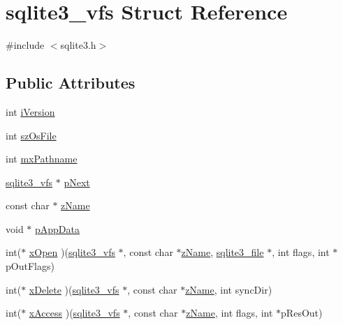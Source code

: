 \hypertarget{structsqlite3__vfs}{}\section{sqlite3\+\_\+vfs Struct Reference}
\label{structsqlite3__vfs}


{\ttfamily \#include $<$sqlite3.\+h$>$}

\subsection*{Public Attributes}
\begin{DoxyCompactItemize}
\item 
int \mbox{\hyperlink{structsqlite3__vfs_a694dd264949bd163545fe174510ed019}{i\+Version}}
\item 
int \mbox{\hyperlink{structsqlite3__vfs_a549399081342d61134b6398562a0a997}{sz\+Os\+File}}
\item 
int \mbox{\hyperlink{structsqlite3__vfs_adb2d82c74891b00b5529fb94e7710135}{mx\+Pathname}}
\item 
\mbox{\hyperlink{structsqlite3__vfs}{sqlite3\+\_\+vfs}} $\ast$ \mbox{\hyperlink{structsqlite3__vfs_ae795a4417697ecd35163f6cdf0069073}{p\+Next}}
\item 
const char $\ast$ \mbox{\hyperlink{structsqlite3__vfs_a0f06a27ac2201ea04c0623ef19e5d73e}{z\+Name}}
\item 
void $\ast$ \mbox{\hyperlink{structsqlite3__vfs_a1ba832cf207fe59c1fc8eb436524bc35}{p\+App\+Data}}
\item 
int($\ast$ \mbox{\hyperlink{structsqlite3__vfs_ab106b445eb5d372266a1108fc982a9aa}{x\+Open}} )(\mbox{\hyperlink{structsqlite3__vfs}{sqlite3\+\_\+vfs}} $\ast$, const char $\ast$\mbox{\hyperlink{structsqlite3__vfs_a0f06a27ac2201ea04c0623ef19e5d73e}{z\+Name}}, \mbox{\hyperlink{structsqlite3__file}{sqlite3\+\_\+file}} $\ast$, int flags, int $\ast$p\+Out\+Flags)
\item 
int($\ast$ \mbox{\hyperlink{structsqlite3__vfs_a9a84baca80b7ab2da9fb147cb40c73d2}{x\+Delete}} )(\mbox{\hyperlink{structsqlite3__vfs}{sqlite3\+\_\+vfs}} $\ast$, const char $\ast$\mbox{\hyperlink{structsqlite3__vfs_a0f06a27ac2201ea04c0623ef19e5d73e}{z\+Name}}, int sync\+Dir)
\item 
int($\ast$ \mbox{\hyperlink{structsqlite3__vfs_a3a5cc43f1b8a88747eb77db730ce4f69}{x\+Access}} )(\mbox{\hyperlink{structsqlite3__vfs}{sqlite3\+\_\+vfs}} $\ast$, const char $\ast$\mbox{\hyperlink{structsqlite3__vfs_a0f06a27ac2201ea04c0623ef19e5d73e}{z\+Name}}, int flags, int $\ast$p\+Res\+Out)

\end{DoxyCompactItemize}
